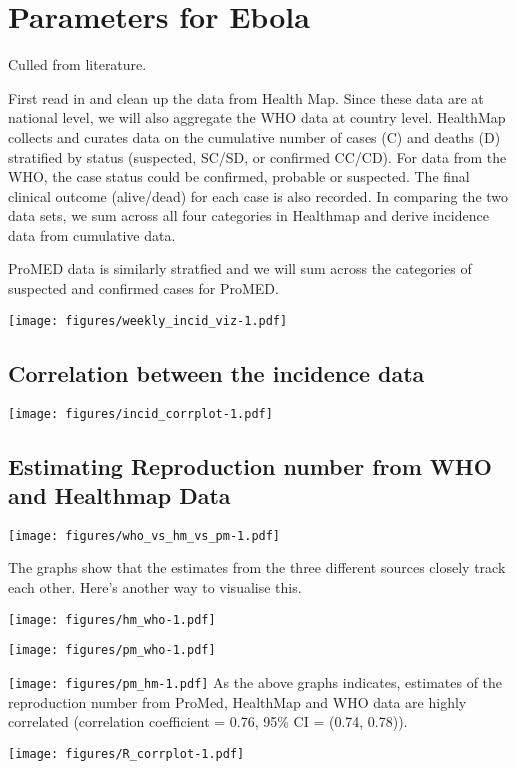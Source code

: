 \documentclass[11pt,]{article}
\title{}
\author{true}
\date{Y}
\begin{document}
\section{Parameters for Ebola}\label{parameters-for-ebola}

Culled from literature.

First read in and clean up the data from Health Map. Since these data
are at national level, we will also aggregate the WHO data at country
level. HealthMap collects and curates data on the cumulative number of
cases (C) and deaths (D) stratified by status (suspected, SC/SD, or
confirmed CC/CD). For data from the WHO, the case status could be
confirmed, probable or suspected. The final clinical outcome
(alive/dead) for each case is also recorded. In comparing the two data
sets, we sum across all four categories in Healthmap and derive
incidence data from cumulative data.

ProMED data is similarly stratfied and we will sum across the categories
of suspected and confirmed cases for ProMED.

\texttt{[image: figures/weekly\_incid\_viz-1.pdf]}

\subsection{Correlation between the incidence
data}\label{correlation-between-the-incidence-data}

\texttt{[image: figures/incid\_corrplot-1.pdf]}

\subsection{Estimating Reproduction number from WHO and Healthmap
Data}\label{estimating-reproduction-number-from-who-and-healthmap-data}

\texttt{[image: figures/who\_vs\_hm\_vs\_pm-1.pdf]}

The graphs show that the estimates from the three different sources
closely track each other. Here's another way to visualise this.

\texttt{[image: figures/hm\_who-1.pdf]}

\texttt{[image: figures/pm\_who-1.pdf]}

\texttt{[image: figures/pm\_hm-1.pdf]} As the above graphs indicates,
estimates of the reproduction number from ProMed, HealthMap and WHO data
are highly correlated (correlation coefficient = 0.76, 95\% CI = (0.74,
0.78)).

\texttt{[image: figures/R\_corrplot-1.pdf]}
\end{document}
